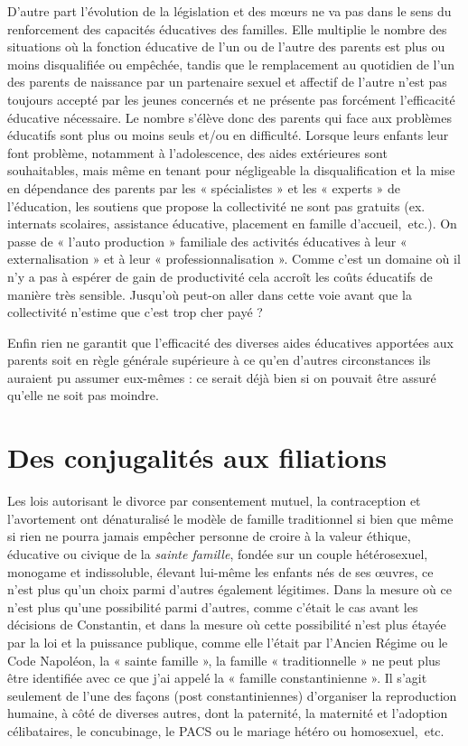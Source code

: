 D'autre part l'évolution de la législation et des mœurs ne va pas dans le sens du renforcement des capacités éducatives des familles. Elle multiplie le nombre des situations où la fonction éducative de l'un ou de l'autre des parents est plus ou moins disqualifiée ou empêchée, tandis que le remplacement au quotidien de l'un des parents de naissance par un partenaire sexuel et affectif de l'autre n'est pas toujours accepté par les jeunes concernés et ne présente pas forcément l'efficacité éducative nécessaire. Le nombre s'élève donc des parents qui face aux problèmes éducatifs sont plus ou moins seuls et/ou en difficulté. Lorsque leurs enfants leur font problème, notamment à l'adolescence, des aides extérieures sont souhaitables, mais même en tenant pour négligeable la disqualification et la mise en dépendance des parents par les « spécialistes » et les « experts » de l'éducation, les soutiens que propose la collectivité ne sont pas gratuits (ex. internats scolaires, assistance éducative, placement en famille d'accueil,~etc.). On passe de « l'auto production » familiale des activités éducatives à leur « externalisation » et à leur « professionnalisation ». Comme c'est un domaine où il n'y a pas à espérer de gain de productivité cela accroît les coûts éducatifs de manière très sensible. Jusqu'où peut-on aller dans cette voie avant que la collectivité n'estime que c'est trop cher payé ? 

Enfin rien ne garantit que l'efficacité des diverses aides éducatives apportées aux parents soit en règle générale supérieure à ce qu'en d'autres circonstances ils auraient pu assumer eux-mêmes : ce serait déjà bien si on pouvait être assuré qu'elle ne soit pas moindre. 

 

\chapter{Des conjugalités aux filiations}


Les lois autorisant le divorce par consentement mutuel, la contraception et l'avortement ont dénaturalisé le modèle de famille traditionnel si bien que même si rien ne pourra jamais empêcher personne de croire à la valeur éthique, éducative ou civique de la {\emph{sainte famille}}, fondée sur un couple hétérosexuel, monogame et indissoluble, élevant lui-même les enfants nés de ses œuvres, ce n'est plus qu'un choix parmi d'autres également légitimes. Dans la mesure où ce n'est plus qu'une possibilité parmi d'autres, comme c'était le cas avant les décisions de Constantin, et dans la mesure où cette possibilité n'est plus étayée par la loi et la puissance publique, comme elle l'était par l'Ancien Régime ou le Code Napoléon, la « sainte famille », la famille « traditionnelle » ne peut plus être identifiée avec ce que j'ai appelé la « famille constantinienne ». Il s'agit seulement de l'une des façons (post constantiniennes) d'organiser la reproduction humaine, à côté de diverses autres, dont la paternité, la maternité et l'adoption célibataires, le concubinage, le PACS ou le mariage hétéro ou homosexuel,~etc.

